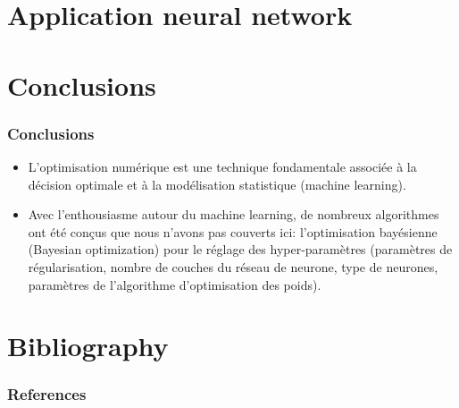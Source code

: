 \documentclass[12pt]{beamer}
\begin{document}
\section{Application neural network}

\section*{Conclusions}

\begin{frame}
\frametitle{Conclusions}
\begin{itemize}
\item L'optimisation numérique est une technique fondamentale associée à la décision optimale et à la modélisation statistique (machine learning).
\item Avec l'enthousiasme autour du machine learning, de nombreux algorithmes ont été conçus que nous n'avons pas couverts ici: l'optimisation bayésienne (Bayesian optimization) pour le réglage des hyper-paramètres (paramètres de régularisation, nombre de couches du réseau de neurone, type de neurones, paramètres de l'algorithme d'optimisation des poids).
\end{itemize}
\end{frame}

\section{Bibliography}

\begin{frame}[allowframebreaks]
\frametitle{References}
\scriptsize
%   
   
   
\end{frame}
\end{document}
